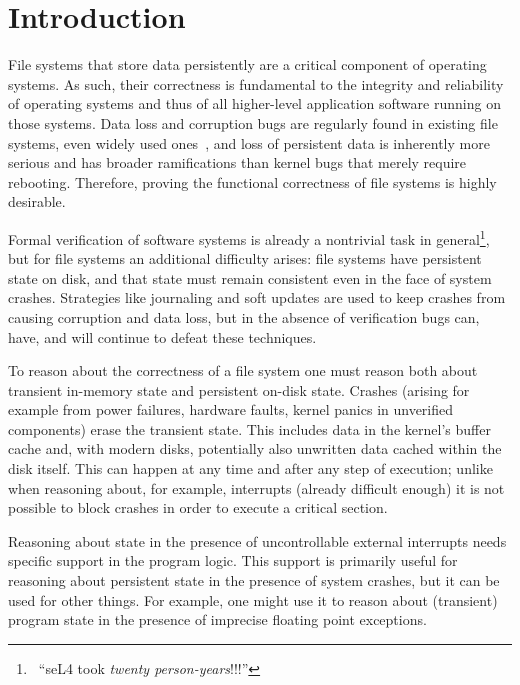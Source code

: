 \begin{abstract}
{\it
{}
}
\end{abstract}

\section{Introduction}

File systems that store data persistently are a critical component of
operating systems.
As such, their correctness is fundamental to the integrity and
reliability of operating systems and thus of all higher-level
application software running on those systems.
Data loss and corruption bugs are regularly found in existing
file systems, even widely used ones~\cite{yang2006explode},
and loss of persistent data is inherently more serious and has broader
ramifications than kernel bugs that merely require rebooting.
Therefore, proving the functional correctness of file systems is
highly desirable.

Formal verification of software systems is already a
nontrivial task in general\footnote{\
``seL4 took
\textit{twenty person-years}!!!''},
but for file systems an additional difficulty arises:
file systems have persistent state on disk, and
that state must remain consistent even in the face of
system crashes.
Strategies like journaling and soft updates are used to keep crashes
from causing corruption and data loss, but in the absence of
verification bugs can, have, and will continue to defeat these
techniques.

To reason about the correctness of a file system one must reason both
about transient in-memory state and persistent on-disk state.
Crashes (arising for example from power failures, hardware faults,
kernel panics in unverified components) erase the transient state.
This includes data in the kernel's buffer cache and, with modern
disks, potentially also unwritten data cached within the disk itself.
This can happen at any time and after any step of execution; unlike
when reasoning about, for example,
interrupts (already difficult enough) it is not possible to
block crashes in order to execute a critical section.

Reasoning about state in the presence of uncontrollable external
interrupts needs
specific support in the program logic.
This support is primarily useful for reasoning about persistent state
in the presence of system crashes, but it can be used for other
things.
For example, one might use it to reason about (transient) program
state in the presence of imprecise floating point exceptions.

